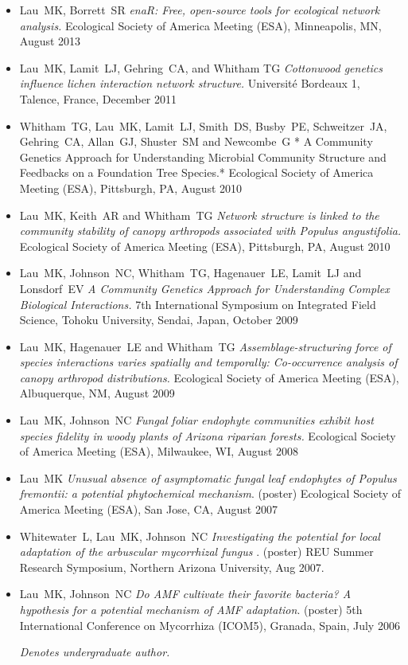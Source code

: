 \documentclass[]{article}
\begin{document}
\begin{itemize}
\item
  Lau~MK, Borrett~SR \emph{enaR: Free, open-source tools for ecological
  network analysis.} Ecological Society of America Meeting (ESA),
  Minneapolis, MN, August 2013
\item
  Lau~MK, Lamit~LJ, Gehring~CA, and Whitham TG \emph{Cottonwood genetics
  influence lichen interaction network structure.} Université Bordeaux
  1, Talence, France, December 2011
\item
  Whitham~TG, Lau~MK, Lamit~LJ, Smith~DS, Busby~PE, Schweitzer~JA,
  Gehring~CA, Allan~GJ, Shuster~SM and Newcombe~G * A Community Genetics
  Approach for Understanding Microbial Community Structure and Feedbacks
  on a Foundation Tree Species.* Ecological Society of America Meeting
  (ESA), Pittsburgh, PA, August 2010
\item
  Lau~MK, Keith~AR and Whitham~TG \emph{Network structure is linked to
  the community stability of canopy arthropods associated with Populus
  angustifolia.} Ecological Society of America Meeting (ESA),
  Pittsburgh, PA, August 2010
\item
  Lau~MK, Johnson~NC, Whitham~TG, Hagenauer~LE, Lamit~LJ and Lonsdorf~EV
  \emph{A Community Genetics Approach for Understanding Complex
  Biological Interactions.} 7th International Symposium on Integrated
  Field Science, Tohoku University, Sendai, Japan, October 2009
\item
  Lau~MK, Hagenauer~LE and Whitham~TG \emph{Assemblage-structuring force
  of species interactions varies spatially and temporally: Co-occurrence
  analysis of canopy arthropod distributions.} Ecological Society of
  America Meeting (ESA), Albuquerque, NM, August 2009
\item
  Lau~MK, Johnson~NC \emph{Fungal foliar endophyte communities exhibit
  host species fidelity in woody plants of Arizona riparian forests.}
  Ecological Society of America Meeting (ESA), Milwaukee, WI, August
  2008
\item
  Lau~MK \emph{Unusual absence of asymptomatic fungal leaf endophytes of
  Populus fremontii: a potential phytochemical mechanism}. (poster)
  Ecological Society of America Meeting (ESA), San Jose, CA, August 2007
\item
  Whitewater~L, Lau~MK, Johnson~NC \emph{Investigating the potential for
  local adaptation of the arbuscular mycorrhizal fungus} . (poster) REU
  Summer Research Symposium, Northern Arizona University, Aug 2007.
\item
  Lau~MK, Johnson~NC \emph{Do AMF cultivate their favorite bacteria? A
  hypothesis for a potential mechanism of AMF adaptation}. (poster) 5th
  International Conference on Mycorrhiza (ICOM5), Granada, Spain, July
  2006

  \emph{Denotes undergraduate author.}
\end{itemize}
\end{document}
